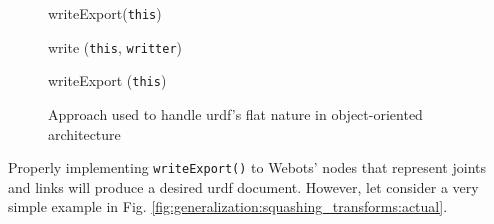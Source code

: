 \begin{figure}[H]
    \begin{minipage}{\linewidth}
    \begin{procedure}[H]
    
        
        
        writeExport(\texttt{this}) \;
        
        \caption{write (\texttt{this}, \texttt{writter})}
    \end{procedure}
    \end{minipage}
    \begin{minipage}{\linewidth}
    \begin{procedure}[H]
        \caption{writeExport (\texttt{this})}
    \end{procedure}
    \end{minipage}
\caption{Approach used to handle \ac{urdf}'s flat nature in object-oriented architecture}
\label{fig:generalization:urdf_flat}
\end{figure}

Properly implementing \texttt{writeExport()} to Webots' nodes that represent joints and links will produce a desired \ac{urdf} document.
However, let consider a very simple example in Fig. \ref{fig:generalization:squashing_transforms:actual}.

